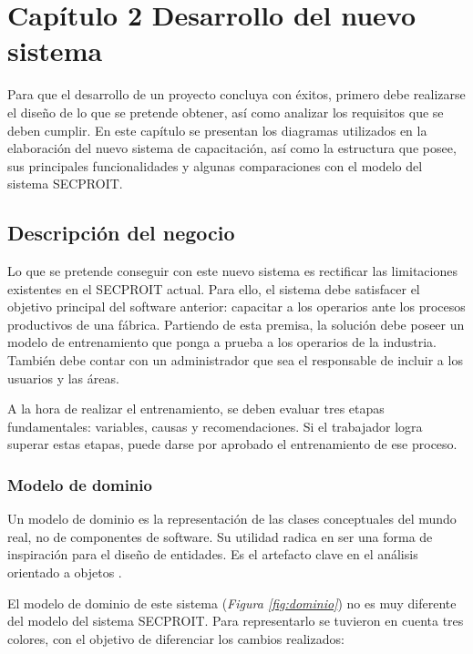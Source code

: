 \chapter*{Capítulo 2 \vspace{0.5cm} \break Desarrollo del nuevo sistema}
\setcounter{chapter}{2}
\setcounter{section}{0}

Para que el desarrollo de un proyecto concluya con éxitos, primero debe realizarse el diseño de lo que se pretende obtener, así como analizar los requisitos que se deben cumplir. En este capítulo se presentan los diagramas utilizados en la elaboración del nuevo sistema de capacitación, así como la estructura que posee, sus principales funcionalidades y algunas comparaciones con el modelo del sistema SECPROIT.

\section{Descripción del negocio}
Lo que se pretende conseguir con este nuevo sistema es rectificar las limitaciones existentes en el SECPROIT actual. Para ello, el sistema debe satisfacer el objetivo principal del software anterior: capacitar a los operarios ante los procesos productivos de una fábrica.
Partiendo de esta premisa, la solución debe poseer un modelo de entrenamiento que ponga a prueba a los operarios de la industria. También debe contar con un administrador que sea el responsable de incluir a los usuarios y las áreas.

A la hora de realizar el entrenamiento, se deben evaluar tres etapas fundamentales: variables, causas y recomendaciones. Si el trabajador logra superar estas etapas, puede darse por aprobado el entrenamiento de ese proceso.

\subsection{Modelo de dominio}
Un modelo de dominio es la representación de las clases conceptuales del mundo real, no de componentes de software. Su utilidad radica en ser una forma de inspiración para el diseño de entidades. Es el artefacto clave en el análisis orientado a objetos \cite{Herchi2012}.

El modelo de dominio de este sistema (\textsl{Figura \ref{fig:dominio}}) no es muy diferente del modelo del sistema SECPROIT. Para representarlo se tuvieron en cuenta tres colores, con el objetivo de diferenciar los cambios realizados:

